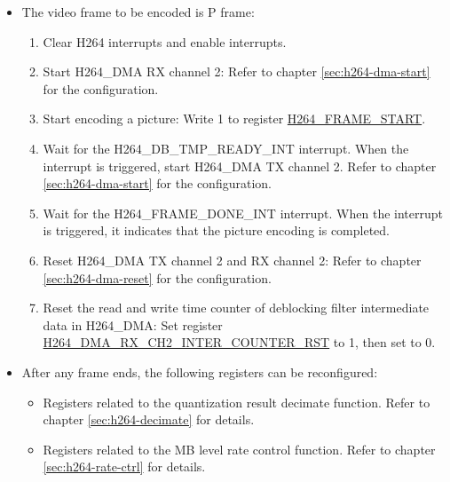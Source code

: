 \documentclass[main\_\_EN.tex]{subfiles}
\begin{document}
\begin{enumerate}
\begin{itemize}
\begin{enumerate}
            \item Wait for the H264\_FRAME\_DONE\_INT interrupt. When the interrupt is triggered, it indicates that the picture encoding is completed.
            \item Reset H264\_DMA TX channel 2 and RX channel 2: Refer to chapter \ref{sec:h264-dma-reset} for the configuration.
            \item Reset the read and write time counter of the deblocking filter intermediate data in H264\_DMA: Set register \hyperref[fielddesc:H264DMARXCH2INTERCOUNTERRST]{H264\_DMA\_RX\_CH2\_INTER\_COUNTER\_RST} to 1, then set to 0.
        \end{enumerate}
        \item The video frame to be encoded is P frame:
        \begin{enumerate}
            \item Clear H264 interrupts and enable interrupts.
            \item Start H264\_DMA RX channel 2: Refer to chapter \ref{sec:h264-dma-start} for the configuration.
            \item Start encoding a picture: Write 1 to register \hyperref[fielddesc:H264FRAMESTART]{H264\_FRAME\_START}.
            \item Wait for the H264\_DB\_TMP\_READY\_INT interrupt. When the interrupt is triggered, start H264\_DMA TX channel 2. Refer to chapter \ref{sec:h264-dma-start} for the configuration.
            \item Wait for the H264\_FRAME\_DONE\_INT interrupt. When the interrupt is triggered, it indicates that the picture encoding is completed.
            \item Reset H264\_DMA TX channel 2 and RX channel 2: Refer to chapter \ref{sec:h264-dma-reset} for the configuration.
            \item Reset the read and write time counter of deblocking filter intermediate data in H264\_DMA: Set register \hyperref[fielddesc:H264DMARXCH2INTERCOUNTERRST]{H264\_DMA\_RX\_CH2\_INTER\_COUNTER\_RST} to 1, then set to 0.
        \end{enumerate}
        \item After any frame ends, the following registers can be reconfigured:
        \begin{itemize}
            \item Registers related to the quantization result decimate function. Refer to chapter \ref{sec:h264-decimate} for details.
            \item Registers related to the MB level rate control function. Refer to chapter \ref{sec:h264-rate-ctrl} for details.

\end{itemize}
\end{itemize}
\end{enumerate}
\end{document}
